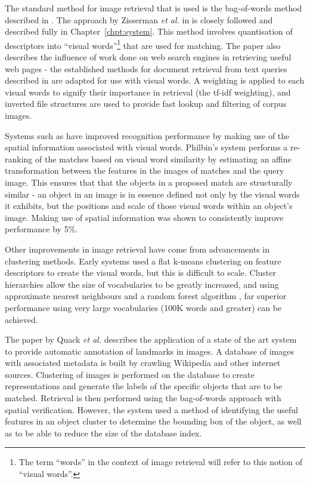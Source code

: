 \documentclass[11pt, onecolumn, a4paper, final]{report} %
\begin{document}
The standard method for image retrieval that is used is the bag-of-words method described in \cite{recognitiontree2006,videogoogle2003}. The approach by Zisserman \emph{et al.} in \cite{videogoogle2003} is closely followed and described fully in Chapter~\ref{chpt:system}. This method involves quantisation of descriptors into ``visual words''\footnote{The term ``words'' in the context of image retrieval will refer to this notion of ``visual words''.} that are used for matching. The paper also describes the influence of work done on web search engines in retrieving useful web pages - the established methods for document retrieval from text queries described in \cite{searchengines2003,googlearchitecture2003} are adapted for use with visual words. A weighting is applied to each visual words to signify their importance in retrieval (the tf-idf weighting), and inverted file structures are used to provide fast lookup and filtering of corpus images.

Systems such as \cite{philbin2007} have improved recognition performance by making use of the spatial information associated with visual words. Philbin's system performs a re-ranking of the matches based on visual word similarity by estimating an affine transformation between the features in the images of matches and the query image. This ensures that that the objects in a proposed match are structurally similar - an object in an image is in essence defined not only by the visual words it exhibits, but the positions and scale of those visual words within an object's image. Making use of spatial information was shown to consistently improve performance by 5\%.

Other improvements in image retrieval have come from advancements in clustering methods. Early systems \cite{videogoogle2003} used a flat k-means clustering on feature descriptors to create the visual words, but this is difficult to scale. Cluster hierarchies \cite{hierarchies2006} allow the size of vocabularies to be greatly increased, and using approximate nearest neighbours and a random forest algorithm \cite{randomforest2005}, far superior performance using very large vocabularies (100K words and greater) can be achieved.

The paper by Quack \emph{et al.} \cite{quack09} describes the application of a state of the art system to provide automatic annotation of landmarks in images. A database of images with associated metadata is built by crawling Wikipedia and other internet sources. Clustering of images is performed on the database to create representations and generate the labels of the specific objects that are to be matched. Retrieval is then performed using the bag-of-words approach with spatial verification. However, the system used a method of identifying the useful features in an object cluster to determine the bounding box of the object, as well as to be able to reduce the size of the database index.
\end{document}
